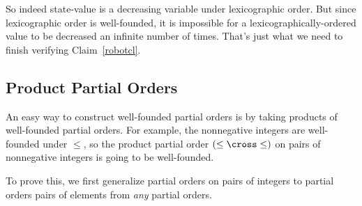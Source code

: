 So indeed state-value is a decreasing variable under lexicographic order.
But since lexicographic order is well-founded, it is impossible for a
lexicographically-ordered value to be decreased an infinite number of
times.  That's just what we need to finish verifying Claim~\ref{robotcl}.

\iffalse
Now notice that the lexicographic order on $\naturals^3$ defined in the
previous section (by the condition~(\ref{lex3})) is exactly the same as
$\lexle$ on $\naturals^3$ according to Definition~\ref{lexn}.

But we already proved that the value of the robot's state decreases at
every step.  And we have just proved that the order on these values is
well-founded.  So Lemma~\ref{d-chain} implies that the values cannot keep
decreasing forever.  That means the robot cannot keep moving forever: it
must always terminate.
\fi

\subsection{Product Partial Orders}

An easy way to construct well-founded partial orders is by taking products
of well-founded partial orders.  For example, the nonnegative integers are
well-founded under $\leq$, so the product partial order $(\leq \cross
\leq)$ on pairs of nonnegative integers is going to be well-founded.

\iffalse

But why stop at $n$ when we can be much more general without being any more
complicated?

The idea is that a Cartesion product, $A_1 \cross A_2 \cross \dots \cross
A_n$ of sets $A_1,A_2, \dots, A_n$ consists of all the $n$-tuples
$\ang{a_1,a_2,\dots,a_n}$ such that $a_i \in A_i$ for $1 \le i \le n$.  But
any such $n$-tuple can be represented by the function, $f$, where $f(i)
\eqdef a_i$.

GO ON TO DEFINE: a \emph{dependent-type} is a set-valued total function.
For example, for $r \in \reals$, define the dependent-type, $F_0$, by the
rule:
\[
F_0(r) \eqdef\ \ \set{t \in \reals \suchthat t \neq r}.
\]

If $F$ is a dependent-type, then an \emph{element of type, $F$,} is
defined to be a total function, $f$, with the same domain as $F$, and such
that
\[
\forall a \in \domain(F)\ f(a) \in F(a).
\]

AND SO ON...
\fi

To prove this, we first generalize partial orders on pairs of integers
to partial orders pairs of elements from \emph{any} partial orders.

